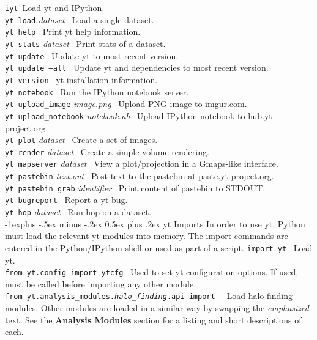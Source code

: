 \documentclass[10pt,landscape]{article}
\makeatletter
\renewcommand{\subsection}{\@startsection{subsection}{2}{0mm}%
                                {-1explus -.5ex minus -.2ex}%
                                {0.5ex plus .2ex}%
                                {\normalfont\normalsize\bfseries}}
\makeatother
\begin{document}
\begin{multicols}{3}
\texttt{iyt}\textemdash\ Load yt and IPython. \\
\texttt{yt load} {\it dataset}   \textemdash\ Load a single dataset.  \\
\texttt{yt help} \textemdash\ Print yt help information. \\
\texttt{yt stats} {\it dataset} \textemdash\ Print stats of a dataset. \\
\texttt{yt update} \textemdash\ Update yt to most recent version.\\
\texttt{yt update --all} \textemdash\ Update yt and dependencies to most recent version. \\
\texttt{yt version} \textemdash\ yt installation information. \\
\texttt{yt notebook} \textemdash\ Run the IPython notebook server. \\
\texttt{yt upload\_image} {\it image.png} \textemdash\ Upload PNG image to imgur.com. \\
\texttt{yt upload\_notebook} {\it notebook.nb} \textemdash\ Upload IPython notebook to hub.yt-project.org.\\
\texttt{yt plot} {\it dataset} \textemdash\ Create a set of images.\\
\texttt{yt render} {\it dataset} \textemdash\ Create a simple
 volume rendering. \\
\texttt{yt mapserver} {\it dataset} \textemdash\ View a plot/projection in a Gmaps-like
 interface. \\
\texttt{yt pastebin} {\it text.out} \textemdash\ Post text to the pastebin at
 paste.yt-project.org. \\ 
\texttt{yt pastebin\_grab} {\it identifier} \textemdash\ Print content of pastebin to
 STDOUT. \\
\texttt{yt bugreport} \textemdash\ Report a yt bug. \\
\texttt{yt hop} {\it dataset} \textemdash\  Run hop on a dataset. \\

\subsection{yt Imports}
In order to use yt, Python must load the relevant yt modules into memory.
The import commands are entered in the Python/IPython shell or
used as part of a script.
\newlength{\MyLen}
\texttt{import yt}  \textemdash\ 
Load yt. \\
\texttt{from yt.config import ytcfg}  \textemdash\ 
Used to set yt configuration options.
If used, must be called before importing any other module.\\
\texttt{from yt.analysis\_modules.\emph{halo\_finding}.api import \textasteriskcentered}  \textemdash\ 
Load halo finding modules. Other modules
are loaded in a similar way by swapping the 
{\em emphasized} text.
See the \textbf{Analysis Modules} section for a listing and short descriptions of each.


\end{multicols}
\end{document}
